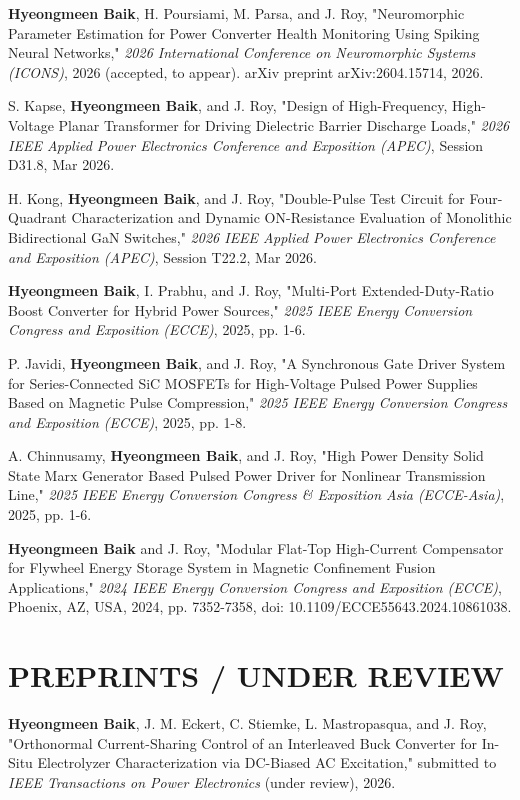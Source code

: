 \documentclass[a4paper,9pt]{extarticle}
\begin{document}
\medskip\noindent
\textbf{Hyeongmeen Baik}, H. Poursiami, M. Parsa, and J. Roy, "Neuromorphic Parameter Estimation for Power Converter Health Monitoring Using Spiking Neural Networks," \textit{2026 International Conference on Neuromorphic Systems (ICONS)}, 2026 (accepted, to appear). arXiv preprint arXiv:2604.15714, 2026.

\medskip\noindent
S. Kapse, \textbf{Hyeongmeen Baik}, and J. Roy, "Design of High-Frequency, High-Voltage Planar Transformer for Driving Dielectric Barrier Discharge Loads," \textit{2026 IEEE Applied Power Electronics Conference and Exposition (APEC)}, Session D31.8, Mar 2026.

\medskip\noindent
H. Kong, \textbf{Hyeongmeen Baik}, and J. Roy, "Double-Pulse Test Circuit for Four-Quadrant Characterization and Dynamic ON-Resistance Evaluation of Monolithic Bidirectional GaN Switches," \textit{2026 IEEE Applied Power Electronics Conference and Exposition (APEC)}, Session T22.2, Mar 2026.

\medskip\noindent
\textbf{Hyeongmeen Baik}, I. Prabhu, and J. Roy, "Multi-Port Extended-Duty-Ratio Boost Converter for Hybrid Power Sources," \textit{2025 IEEE Energy Conversion Congress and Exposition (ECCE)}, 2025, pp. 1-6.

\medskip\noindent
P. Javidi, \textbf{Hyeongmeen Baik}, and J. Roy, "A Synchronous Gate Driver System for Series-Connected SiC MOSFETs for High-Voltage Pulsed Power Supplies Based on Magnetic Pulse Compression," \textit{2025 IEEE Energy Conversion Congress and Exposition (ECCE)}, 2025, pp. 1-8.

\medskip\noindent
A. Chinnusamy, \textbf{Hyeongmeen Baik}, and J. Roy, "High Power Density Solid State Marx Generator Based Pulsed Power Driver for Nonlinear Transmission Line," \textit{2025 IEEE Energy Conversion Congress \& Exposition Asia (ECCE-Asia)}, 2025, pp. 1-6.

\medskip\noindent
\textbf{Hyeongmeen Baik} and J. Roy, "Modular Flat-Top High-Current Compensator for Flywheel Energy Storage System in Magnetic Confinement Fusion Applications," \textit{2024 IEEE Energy Conversion Congress and Exposition (ECCE)}, Phoenix, AZ, USA, 2024, pp. 7352-7358, doi: 10.1109/ECCE55643.2024.10861038.

\section*{PREPRINTS / UNDER REVIEW}
\noindent
\textbf{Hyeongmeen Baik}, J. M. Eckert, C. Stiemke, L. Mastropasqua, and J. Roy, "Orthonormal Current-Sharing Control of an Interleaved Buck Converter for In-Situ Electrolyzer Characterization via DC-Biased AC Excitation," submitted to \textit{IEEE Transactions on Power Electronics} (under review), 2026.
\end{document}

